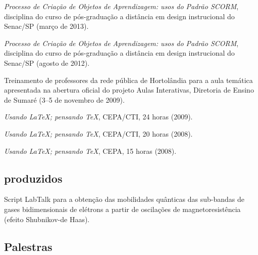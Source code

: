 \begin{compactitem}
  \item \textsl{Processo de Criação de Objetos de Aprendizagem: usos do Padrão SCORM}, disciplina do curso de pós-graduação a distância em design instrucional do Senac/SP (março de 2013).
  \item \textsl{Processo de Criação de Objetos de Aprendizagem: usos do Padrão SCORM}, disciplina do curso de pós-graduação a distância em design instrucional do Senac/SP (agosto de 2012).
  \item Treinamento de professores da rede pública de Hortolândia para a aula temática apresentada na abertura oficial do projeto Aulas Interativas, Diretoria de Ensino de Sumaré (3--5 de novembro de 2009).
  \item \textsl{Usando \LaTeX; pensando \TeX}, CEPA/CTI, 24 horas (2009).
  \item \textsl{Usando \LaTeX; pensando \TeX}, CEPA/CTI, 20 horas (2008).
  \item \textsl{Usando \LaTeX; pensando \TeX}, CEPA, 15 horas (2008).
\end{compactitem}

\subsection{ produzidos}

\begin{compactitem}
  \item Script LabTalk para a obtenção das mobilidades quânticas das sub-bandas de gases bidimensionais de elétrons a partir de oscilações de magnetoresistência (efeito Shubnikov-de Haas).
\end{compactitem}

\subsection{Palestras}

